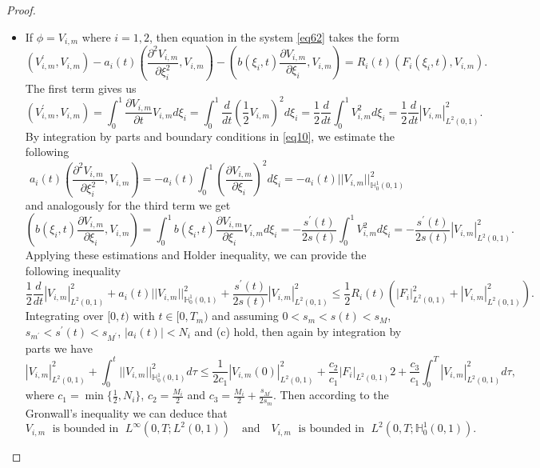 \documentclass[10pt,a4paper]{amsart}
\begin{document}
\begin{proof}
    \begin{itemize}
        \item [Case 1.] If $\phi=V_{i,m}$ where $i=1,2$, then equation in the system \eqref{eq62} takes the form
        $$\left(V_{i,m}^{\prime},V_{i,m}\right)-a_i(t)\left(\frac{\partial^2 V_{i,m}}{\partial \xi_i^2},V_{i,m}\right)-\left(b(\xi_i,t)\frac{\partial V_{i,m}}{\partial \xi_i},V_{i,m}\right)=R_i(t)\left(F_i(\xi_i,t),V_{i,m}\right).$$
        The first term gives us
        $$\left(V_{i,m}^{\prime},V_{i,m}\right)=\int_0^1\frac{\partial V_{i,m}}{\partial t}V_{i,m}d\xi_i=\int_0^1\frac{d}{dt}\left(\frac{1}{2}V_{i,m}\right)^2d\xi_i=\frac{1}{2}\frac{d}{dt}\int_0^1 V_{i,m}^2d\xi_i=\frac{1}{2}\frac{d}{dt}\left|V_{i,m}\right|_{L^2(0,1)}^2.$$
        By integration by parts and boundary conditions in \eqref{eq10}, we estimate the following
        $$a_i(t)\left(\frac{\partial^2 V_{i,m}}{\partial \xi_i^2},V_{i,m}\right)=-a_i(t)\int_0^1 \left(\frac{\partial V_{i,m}}{\partial \xi_i}\right)^2 d\xi_i=-a_i(t)||V_{i,m}||^2_{\mathbb{H}_0^1(0,1)}$$
        and analogously for the third term we get
        $$\left(b(\xi_i,t)\frac{\partial V_{i,m}}{\partial \xi_i},V_{i,m}\right)=\int_0^1 b(\xi_i,t)\frac{\partial V_{i,m}}{\partial \xi_i}V_{i,m}d\xi_i=-\frac{s^{\prime}(t)}{2s(t)}\int_0^1 V_{i,m}^2 d\xi_i=-\frac{s^{\prime}(t)}{2s(t)}\left|V_{i,m}\right|^2_{L^2(0,1)}.$$
        Applying these estimations and Holder inequality, we can provide the following inequality
        $$\frac{1}{2}\frac{d}{dt}|V_{i,m}|_{L^2(0,1)}^2+a_i(t)||V_{i,m}||_{\mathbb{H}_0^1(0,1)}^2+\frac{s^{\prime}(t)}{2s(t)}\left|V_{i,m}\right|^2_{L^2(0,1)}\leq \frac{1}{2}R_i(t)\left(|F_i|_{L^2(0,1)}^2+|V_{i,m}|_{L^2(0,1)}^2\right).$$
        Integrating over $[0,t)$ with $t\in[0,T_m)$ and assuming $0<s_m<s(t)<s_M$, $s_{m^{\prime}}<s^{\prime}(t)<s_{M^{\prime}}$, $|a_i(t)|<N_i$  and (c) hold, then again by integration by parts we have
        $$|V_{i,m}|_{L^2(0,1)}^2+\int_0^t ||V_{i,m}||_{\mathbb{H}_0^1(0,1)}^2d\tau\leq\frac{1}{2c_1}|V_{i,m}(0)|_{L^2(0,1)}^2+\frac{c_2}{c_1}|F_{i}|_{L^2(0,1)}2+\frac{c_3}{c_1}\int_0^T |V_{i,m}|_{L^2(0,1)}^2d\tau,$$
        where $c_1=\min\{\frac{1}{2}, N_i\}$, $c_2=\frac{M_i}{2}$ and $c_3=\frac{M_i}{2}+\frac{s_{M^{\prime}}}{2s_m}$. Then according to the Gronwall's inequality we can deduce that
        $$V_{i,m}\;\text{ is bounded in }\;L^{\infty}(0,T; L^2(0,1))\quad\text{and}\quad V_{i,m}\;\text{ is bounded in }\; L^2(0,T;\mathbb{H}_0^1(0,1)).$$


\end{itemize}
\end{proof}
\end{document}
